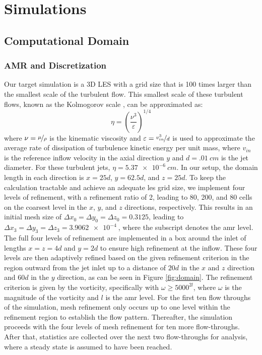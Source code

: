\chapter{Simulations}


\section{Computational Domain}
\subsection{AMR and Discretization}
Our target simulation is a 3D LES with a grid size that is 100 times larger than the smallest scale of the turbulent flow. This smallest scale of these turbulent flows, known as the Kolmogorov scale \cite{kolmogorov}, can be approximated as:
\begin{equation} \label{Kolmogorov}
	\eta = \left( \dfrac{\nu^3}{\varepsilon} \right)^{1/4}
\end{equation}
where $\nu = \nicefrac{\mu}{\rho}$ is the kinematic viscosity and $\varepsilon = \nicefrac{v_{in}^3}{d}$ is used to approximate the average rate of dissipation of turbulence kinetic energy per unit mass, where $v_{in}$ is the reference inflow velocity in the axial direction $y$ and $d=\SI{.01}{cm}$ is the jet diameter. For these turbulent jets, $\eta = \SI{5.37e-6}{cm}$. In our setup, the domain length in each direction is $x = 25d$, $y = 62.5d$, and $z = 25d$. To keep the calculation tractable \cite{} and achieve an adequate \gls{les} grid size, we implement four levels of refinement, with a refinement ratio of 2, leading to 80, 200, and 80 cells on the coarsest level in the $x$, $y$, and $z$ directions, respectively. This results in an initial mesh size of $\Delta x_{0}=\Delta y_{0}=\Delta z_{0}=0.3125$, leading to $\Delta x_{3}=\Delta y_{3}=\Delta z_{3}=\SI{3.9062e-4}{}$, where the subscript denotes the \gls{amr} level. The full four levels of refinement are implemented in a box around the inlet of lengths $x=z=4d$ and $y=2d$ to ensure high refinement at the inflow. These four levels are then adaptively refined based on the given refinement criterion in the region outward from the jet inlet up to a distance of $20d$ in the $x$ and $z$ direction and $60d$ in the $y$ direction, as can be seen in Figure \ref{fig:domain}. The refinement criterion is given by the vorticity, specifically with $\omega \geq 5000^{2l}$, where $\omega$ is the magnitude of the vorticity and $l$ is the \gls{amr} level. For the first ten flow throughs of the simulation, mesh refinement only occurs up to one level within the refinement region to establish the flow pattern. Thereafter, the simulation proceeds with the four levels of mesh refinement for ten more flow-throughs. After that, statistics are collected over the next two flow-throughs for analysis, where a steady state is assumed to have been reached.
